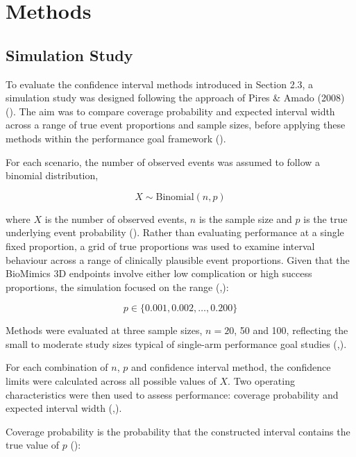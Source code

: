 \documentclass{article}
\begin{document}
\section{Methods}\label{methods}

\subsection{Simulation Study}\label{simulation-study}

To evaluate the confidence interval methods introduced in Section 2.3, a
simulation study was designed following the approach of Pires \& Amado
(2008) (). The aim was to compare
coverage probability and expected interval width across a range of true
event proportions and sample sizes, before applying these methods within
the performance goal framework ().

For each scenario, the number of observed events was assumed to follow a
binomial distribution,

\[X \sim \text{Binomial}(n, p)\]

where \(X\) is the number of observed events, \(n\) is the sample size
and \(p\) is the true underlying event probability
(). Rather than evaluating
performance at a single fixed proportion, a grid of true proportions was
used to examine interval behaviour across a range of clinically
plausible event proportions. Given that the BioMimics 3D endpoints
involve either low complication or high success proportions, the
simulation focused on the range
(,):

\[p \in \{0.001, 0.002, \ldots, 0.200\}\]

Methods were evaluated at three sample sizes, \(n = 20\), 50 and 100,
reflecting the small to moderate study sizes typical of single-arm
performance goal studies
(,).

For each combination of \(n\), \(p\) and confidence interval method, the
confidence limits were calculated across all possible values of \(X\).
Two operating characteristics were then used to assess performance:
coverage probability and expected interval width
(,).

Coverage probability is the probability that the constructed interval
contains the true value of \(p\)
():
\end{document}

